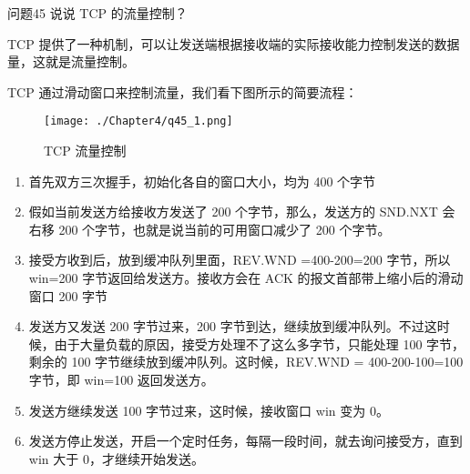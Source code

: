 \documentclass[cn,11pt,color=blue,lang=cn]{elegantbook}
\begin{document}
\begin{custom}{问题45}
说说 TCP 的流量控制？
\end{custom}
\begin{solution}
TCP 提供了一种机制，可以让发送端根据接收端的实际接收能力控制发送的数据量，这就是流量控制。

TCP 通过滑动窗口来控制流量，我们看下图所示的简要流程：
\begin{figure}[htbp]
\centering
\texttt{[image: ./Chapter4/q45\_1.png]}
\caption{TCP 流量控制}
\label{fig45_1}
\end{figure}

\begin{enumerate}
	\item 首先双方三次握手，初始化各自的窗口大小，均为 400 个字节
	\item 假如当前发送方给接收方发送了 200 个字节，那么，发送方的 SND.NXT 会右移 200 个字节，也就是说当前的可用窗口减少了 200 个字节。
	\item 接受方收到后，放到缓冲队列里面，REV.WND =400-200=200 字节，所以 win=200 字节返回给发送方。接收方会在 ACK 的报文首部带上缩小后的滑动窗口 200 字节
	\item 发送方又发送 200 字节过来，200 字节到达，继续放到缓冲队列。不过这时候，由于大量负载的原因，接受方处理不了这么多字节，只能处理 100 字节，剩余的 100 字节继续放到缓冲队列。这时候，REV.WND = 400-200-100=100 字节，即 win=100 返回发送方。
	\item 发送方继续发送 100 字节过来，这时候，接收窗口 win 变为 0。
	\item 发送方停止发送，开启一个定时任务，每隔一段时间，就去询问接受方，直到 win 大于 0，才继续开始发送。
\end{enumerate}
\end{solution}
\end{document}
